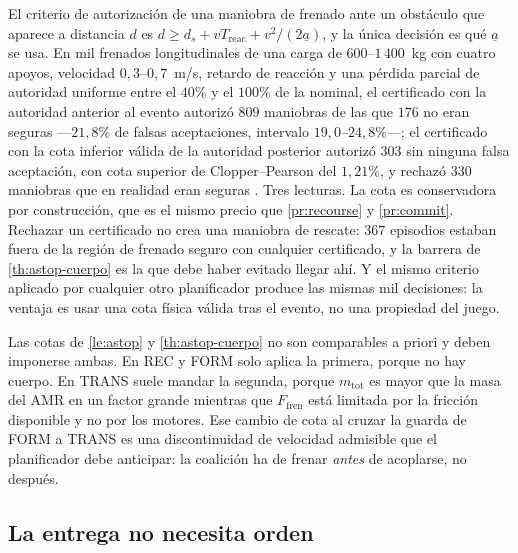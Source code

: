 \begin{observacion}
\label{obs:certificado-postevento}
El criterio de autorización de una maniobra de frenado ante un obstáculo que
aparece a distancia $d$ es $d\ge d_s+vT_{\mathrm{reac}}+v^2/(2\underline a)$,
y la única decisión es qué $\underline a$ se usa. En mil frenados
longitudinales de una carga de $600$--$1\,400$~kg con cuatro apoyos, velocidad
$0{,}3$--$0{,}7$~m/s, retardo de reacción y una pérdida parcial de autoridad
uniforme entre el $40\%$ y el $100\%$ de la nominal, el certificado con la
autoridad anterior al evento autorizó $809$ maniobras de las que $176$ no eran
seguras —$21{,}8\%$ de falsas aceptaciones, intervalo $19{,}0$--$24{,}8\%$—;
el certificado con la cota inferior válida de la autoridad posterior autorizó
$303$ sin ninguna falsa aceptación, con cota superior de Clopper--Pearson del
$1{,}21\%$, y rechazó $330$ maniobras que en realidad eran seguras
\cite{mrob2026r11}. Tres lecturas. La cota es conservadora por construcción,
que es el mismo precio que \cref{pr:recourse} y \cref{pr:commit}. Rechazar un
certificado no crea una maniobra de rescate: $367$ episodios estaban fuera de
la región de frenado seguro con cualquier certificado, y la barrera de
\cref{th:astop-cuerpo} es la que debe haber evitado llegar ahí. Y el mismo
criterio aplicado por cualquier otro planificador produce las mismas mil
decisiones: la ventaja es usar una cota física válida tras el evento, no una
propiedad del juego.
\end{observacion}


\begin{observacion}
\label{obs:dos-frenados}
Las cotas de \cref{le:astop} y \cref{th:astop-cuerpo} no son comparables a
priori y deben imponerse ambas. En \textsf{REC} y \textsf{FORM} solo aplica la
primera, porque no hay cuerpo. En \textsf{TRANS} suele mandar la segunda, porque
$m_{\mathrm{tot}}$ es mayor que la masa del AMR en un factor grande mientras que
$F_{\mathrm{fren}}$ está limitada por la fricción disponible y no por los
motores. Ese cambio de cota al cruzar la guarda de \textsf{FORM} a
\textsf{TRANS} es una discontinuidad de velocidad admisible que el planificador
debe anticipar: la coalición ha de frenar \emph{antes} de acoplarse, no después.
\end{observacion}

\subsection{La entrega no necesita orden}

